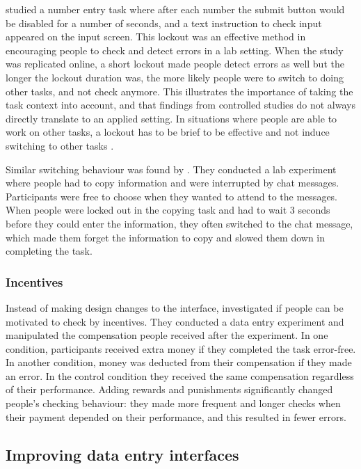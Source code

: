 \citet{Gould2015} studied a number entry task where after each number the submit button would be disabled for a number of seconds, and a text instruction to check input appeared on the input screen.  This lockout was an effective method in encouraging people to check and detect errors in a lab setting. When the study was replicated online, a short lockout made people detect errors as well but the longer the lockout duration was, the more likely people were to switch to doing other tasks, and not check anymore. This illustrates the importance of taking the task context into account, and that findings from controlled studies do not always directly translate to an applied setting. In situations where people are able to work on other tasks, a lockout has to be brief to be effective and not induce switching to other tasks \citep{Gould2015}. 

Similar switching behaviour was found by \citet{Katidioti2013}. They conducted a lab experiment where people had to copy information and were interrupted by chat messages. Participants were free to choose when they wanted to attend to the messages. When people were locked out in the copying task and had to wait 3 seconds before they could enter the information, they often switched to the chat message, which made them forget the information to copy and slowed them down in completing the task.

\subsubsection{Incentives}
Instead of making design changes to the interface, \citet{Li2015} investigated if people can be motivated to check by incentives. 
They conducted a data entry experiment and manipulated the compensation people received after the experiment. In one condition, participants received extra money if they completed the task error-free. In another condition, money was deducted from their compensation if they made an error. In the control condition they received the same compensation regardless of their performance. Adding rewards and punishments significantly changed people's checking behaviour: they made more frequent and longer checks when their payment depended on their performance, and this resulted in fewer errors. 

\subsection{Improving data entry interfaces}


